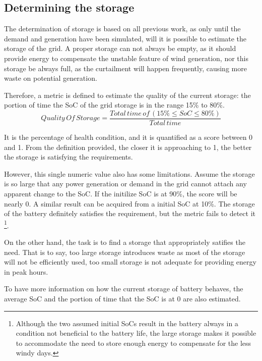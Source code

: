 \documentclass[12pt,a4paper]{report}
\begin{document}
            \subsection{Determining the storage}
            \label{text_determine_storage}
            The determination of storage is based on all previous work, as only until the demand and generation have been simulated, will it is possible to estimate the storage of the grid. A proper storage can not always be empty, as it should provide energy to compensate the unstable feature of wind generation, nor this storage be always full, as the curtailment will happen frequently, causing more waste on potential generation. 
            
            Therefore, a metric is defined to estimate the quality of the current storage: the portion of time the SoC of the grid storage is in the range 15\% to 80\%. 
            \begin{equation}
                Quality\, Of\, Storage = \frac{Total \, time\, of \, (15\% \leq SoC \leq 80\%)}{Total \, time}
            \end{equation}

            It is the percentage of health condition, and it is quantified as a score between 0 and 1. From the definition provided, the closer it is approaching to 1, the better the storage is satisfying the requirements.

            However, this single numeric value also has some limitations. Assume the storage is so large that any power generation or demand in the grid cannot attach any apparent change to the SoC. If the initilize SoC is at 90\%, the score will be nearly 0. A similar result can be acquired from a initial SoC at 10\%. The storage of the battery definitely satisfies the requirement, but the metric fails to detect it \footnote{Although the two assumed initial SoCs result in the battery always in a condition not beneficial to the battery life, the large storage makes it possible to accommodate the need to store enough energy to compensate for the less windy days.}.

            On the other hand, the task is to find a storage that appropriately satifies the need. That is to say, too large storage introduces waste as most of the storage will not be efficiently used, too small storage is not adequate for providing energy in peak hours.

            To have more information on how the current storage of battery behaves, the average SoC and the portion of time that the SoC is at 0 are also estimated.
\end{document}
